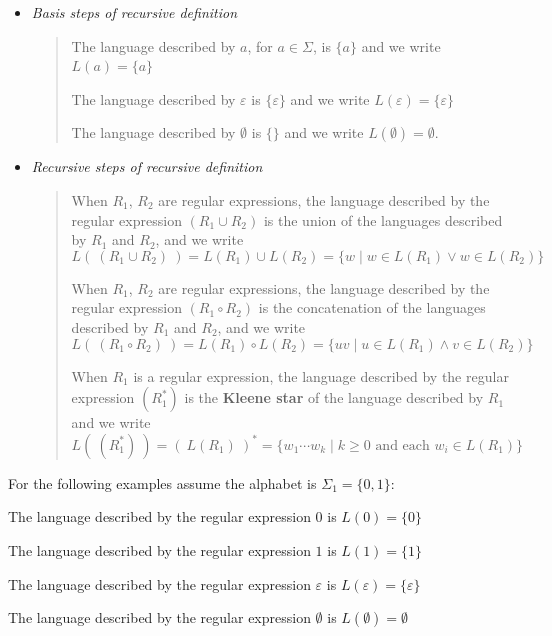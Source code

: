 \documentclass[12pt, oneside]{article}
\begin{document}
\begin{itemize}
    \item[] {\it Basis steps of recursive definition}
    \begin{quote}    
        The language described by $a$, for $a \in \Sigma$, is $\{a\}$ and we write 
        $L(a) = \{a\}$
    
        The language described by $\varepsilon$ is $\{\varepsilon\}$ and we write 
        $L(\varepsilon) = \{ \varepsilon\}$
    
        The language described by $\emptyset$ is $\{\}$ and we write
        $L(\emptyset) = \emptyset$.
    \end{quote}
    
    \item[] {\it Recursive steps of recursive definition}
    \begin{quote}
        When $R_1$, $R_2$ are regular expressions, the language described by the regular
        expression $(R_1 \cup R_2)$ is the union of the languages described by $R_1$ and $R_2$, 
        and we write 
        $$L(~(R_1 \cup R_2)~) = L(R_1) \cup L(R_2) = \{ w \mid w \in L(R_1) \lor w \in L(R_2)\}$$
    
        When $R_1$, $R_2$ are regular expressions, the language described by the regular
        expression $(R_1 \circ R_2)$ is the concatenation of the languages described by $R_1$ and $R_2$, 
        and we write 
        $$L(~(R_1 \circ R_2)~) = L(R_1) \circ L(R_2) = \{ uv \mid u \in L(R_1) \land v \in L(R_2)\}$$
    
        When $R_1$ is a regular expression, the language described by the regular 
        expression $(R_1^*)$ is the {\bf Kleene star} of the language described by $R_1$ and we write
        $$L(~(R_1^*)~) = (~L(R_1)~)^* = \{ w_1 \cdots w_k \mid k \geq 0 \textrm{ and each } w_i \in L(R_1)\}$$
    \end{quote}
\end{itemize}
  
For the following examples assume the alphabet is $\Sigma_1 =  \{0,1\}$:
    
The language described by the regular expression $0$ is $L(0) = \{ 0 \}$

The language described by the regular expression $1$ is $L(1)  = \{ 1 \}$

The language described by the regular expression $\varepsilon$ is $L(\varepsilon) = \{ \varepsilon  \}$

The language described by the regular expression $\emptyset$ is $L(\emptyset) = \emptyset$
\end{document}
